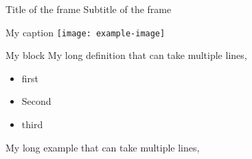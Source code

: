 \documentclass[11pt]{article}
\begin{document}
\begin{frame}{Title of the frame}
 {Subtitle of the frame}


\begin{myfigure}{My caption}
 \texttt{[image: example-image]}
\end{myfigure}



 \begin{block}{My block}
  My long definition that can take multiple lines, 
 \end{block}
  
 \begin{itemize}
  \item first
  \item Second
  \item third
 \end{itemize}
  
 \begin{example}[My example]
  My long example that can take multiple lines, 
 \end{example}
  
\end{frame}
\end{document}
